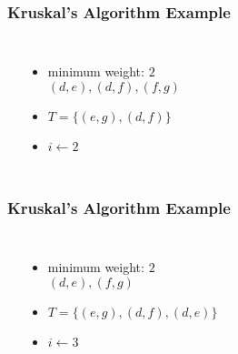 \documentclass[dvipsnames]{beamer}
\begin{document}
\begin{frame}
  \frametitle{Kruskal's Algorithm Example}

  \begin{example}[$1 < 6$]
    \begin{columns}
      \begin{center}
      \end{center}

      \pause
      \begin{itemize}
        \item minimum weight: $2$\\
          $(d,e), (d,f), (f,g)$

        \pause
        \item $T = \{ (e,g), (d,f) \}$
        \item $i \leftarrow 2$
      \end{itemize}
    \end{columns}
  \end{example}
\end{frame}

\begin{frame}
  \frametitle{Kruskal's Algorithm Example}

  \begin{example}[$2 < 6$]
    \begin{columns}
      \begin{center}
      \end{center}

      \pause
      \begin{itemize}
        \item minimum weight: $2$\\
          $(d,e), (f,g)$

        \pause
        \item $T = \{ (e,g), (d,f), (d,e) \}$
        \item $i \leftarrow 3$
      \end{itemize}
    \end{columns}
  \end{example}
\end{frame}
\end{document}
